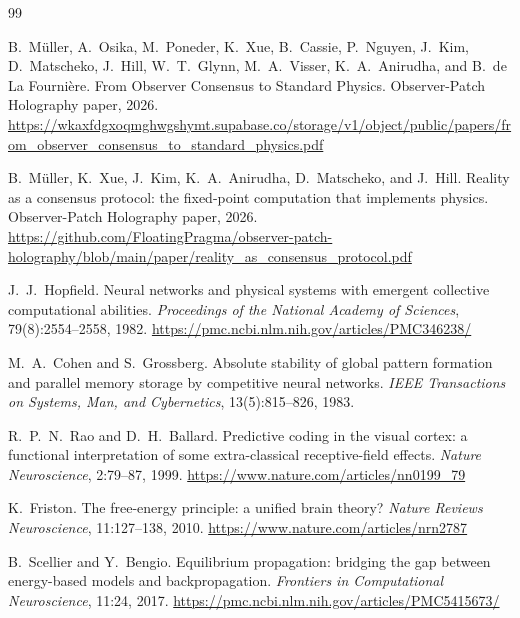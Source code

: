 \documentclass[11pt]{article}
\theoremstyle{remark}
\theoremstyle{plain}
\begin{document}
\begin{thebibliography}{99}

B.\ M\"uller, A.\ Osika, M.\ Poneder, K.\ Xue, B.\ Cassie, P.\ Nguyen, J.\ Kim, D.\ Matscheko, J.\ Hill, W.\ T.\ Glynn, M.\ A.\ Visser, K.\ A.\ Anirudha, and B.\ de La Fourni\`ere.
\newblock From Observer Consensus to Standard Physics.
\newblock Observer-Patch Holography paper, 2026.
\newblock \url{https://wkaxfdgxoqmghwgshymt.supabase.co/storage/v1/object/public/papers/from_observer_consensus_to_standard_physics.pdf}

B.\ M\"uller, K.\ Xue, J.\ Kim, K.\ A.\ Anirudha, D.\ Matscheko, and J.\ Hill.
\newblock Reality as a consensus protocol: the fixed-point computation that implements physics.
\newblock Observer-Patch Holography paper, 2026.
\newblock \url{https://github.com/FloatingPragma/observer-patch-holography/blob/main/paper/reality_as_consensus_protocol.pdf}

J.\ J.\ Hopfield.
\newblock Neural networks and physical systems with emergent collective computational abilities.
\newblock \emph{Proceedings of the National Academy of Sciences}, 79(8):2554--2558, 1982.
\newblock \url{https://pmc.ncbi.nlm.nih.gov/articles/PMC346238/}

M.\ A.\ Cohen and S.\ Grossberg.
\newblock Absolute stability of global pattern formation and parallel memory storage by competitive neural networks.
\newblock \emph{IEEE Transactions on Systems, Man, and Cybernetics}, 13(5):815--826, 1983.

R.\ P.\ N.\ Rao and D.\ H.\ Ballard.
\newblock Predictive coding in the visual cortex: a functional interpretation of some extra-classical receptive-field effects.
\newblock \emph{Nature Neuroscience}, 2:79--87, 1999.
\newblock \url{https://www.nature.com/articles/nn0199_79}

K.\ Friston.
\newblock The free-energy principle: a unified brain theory?
\newblock \emph{Nature Reviews Neuroscience}, 11:127--138, 2010.
\newblock \url{https://www.nature.com/articles/nrn2787}

B.\ Scellier and Y.\ Bengio.
\newblock Equilibrium propagation: bridging the gap between energy-based models and backpropagation.
\newblock \emph{Frontiers in Computational Neuroscience}, 11:24, 2017.
\newblock \url{https://pmc.ncbi.nlm.nih.gov/articles/PMC5415673/}


\end{thebibliography}
\end{document}
